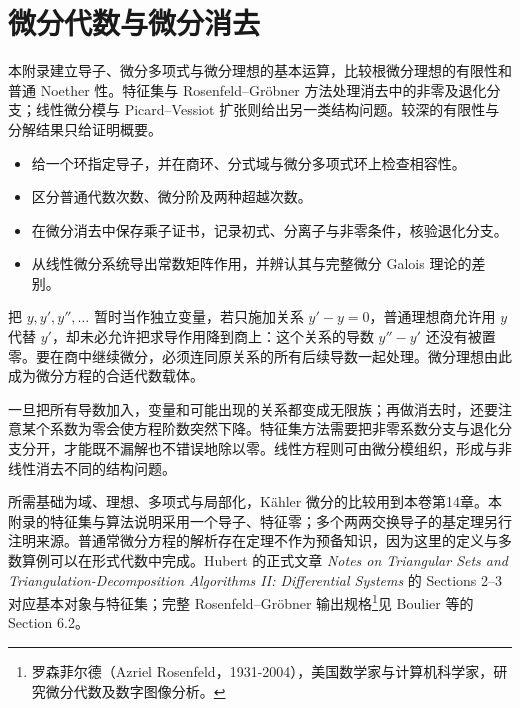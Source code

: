 
\chapter{微分代数与微分消去}
\label{b3:app:E}


\begin{chapterabstract}
	本附录建立导子、微分多项式与微分理想的基本运算，比较根微分理想的有限性和普通 Noether 性。特征集与 Rosenfeld--Gröbner 方法处理消去中的非零及退化分支；线性微分模与 Picard--Vessiot 扩张则给出另一类结构问题。较深的有限性与分解结果只给证明概要。
\end{chapterabstract}

\begin{learninggoals}
	\begin{itemize}
		\item 给一个环指定导子，并在商环、分式域与微分多项式环上检查相容性。
		\item 区分普通代数次数、微分阶及两种超越次数。
		\item 在微分消去中保存乘子证书，记录初式、分离子与非零条件，核验退化分支。
		\item 从线性微分系统导出常数矩阵作用，并辨认其与完整微分 Galois 理论的差别。
	\end{itemize}
\end{learninggoals}

把 \(y,y',y'',\ldots\) 暂时当作独立变量，若只施加关系 \(y'-y=0\)，普通理想商允许用 \(y\) 代替 \(y'\)，却未必允许把求导作用降到商上：这个关系的导数 \(y''-y'\) 还没有被置零。要在商中继续微分，必须连同原关系的所有后续导数一起处理。微分理想由此成为微分方程的合适代数载体。

\ProseParagraphBreak

一旦把所有导数加入，变量和可能出现的关系都变成无限族；再做消去时，还要注意某个系数为零会使方程阶数突然下降。特征集方法需要把非零系数分支与退化分支分开，才能既不漏解也不错误地除以零。线性方程则可由微分模组织，形成与非线性消去不同的结构问题。

\ProseParagraphBreak

所需基础为域、理想、多项式与局部化，Kähler 微分的比较用到本卷第14章。本附录的特征集与算法说明采用一个导子、特征零；多个两两交换导子的基定理另行注明来源。普通常微分方程的解析存在定理不作为预备知识，因为这里的定义与多数算例可以在形式代数中完成。Hubert 的正式文章 \textit{Notes on Triangular Sets and Triangulation-Decomposition Algorithms II: Differential Systems} 的 Sections 2--3 对应基本对象与特征集\cite[Sections 2--3]{Hubert2003DifferentialSystems}；完整 Rosenfeld--Gröbner 输出规格\footnote{罗森菲尔德（Azriel Rosenfeld，1931-2004），美国数学家与计算机科学家，研究微分代数及数字图像分析。}见 Boulier 等的 Section 6.2\cite[Section 6.2, Theorem 60]{BoulierLazardOllivierPetitot2009DifferentialIdeals}。

